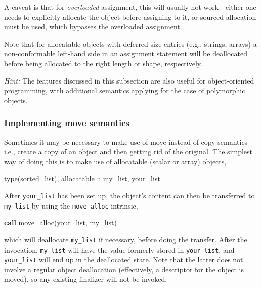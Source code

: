 \documentclass[
  paper=a4,
  ,captions=tableheading
]{scrartcl}
\newenvironment{Shaded}{\begin{snugshade}}{\end{snugshade}}
\newcommand{\DataTypeTok}[1]{\textcolor[rgb]{0.13,0.29,0.53}{#1}}
\newcommand{\KeywordTok}[1]{\textcolor[rgb]{0.13,0.29,0.53}{\textbf{#1}}}
\newcommand{\NormalTok}[1]{#1}
\begin{document}
A caveat is that for \emph{overloaded} assignment, this will usually not
work - either one needs to explicitly allocate the object before
assigning to it, or sourced allocation must be used, which bypasses the
overloaded assignment.

Note that for allocatable objects with deferred-size entries (e.g.,
strings, arrays) a non-conformable left-hand side in an assignment
statement will be deallocated before being allocated to the right length
or shape, respectively.

\emph{Hint:} The features discussed in this subsection are also useful
for object-oriented programming, with additional semantics applying for
the case of polymorphic objects.

\subsubsection{Implementing move
semantics}\label{implementing-move-semantics}

Sometimes it may be necessary to make use of move instead of copy
semantics i.e., create a copy of an object and then getting rid of the
original. The simplest way of doing this is to make use of allocatable
(scalar or array) objects,

\begin{Shaded}
\begin{Highlighting}[]
\DataTypeTok{type(sorted\_list)}\NormalTok{, }\DataTypeTok{allocatable} \DataTypeTok{::}\NormalTok{ my\_list, your\_list}
\end{Highlighting}
\end{Shaded}

After \texttt{your\_list} has been set up, the object's content can then
be transferred to \texttt{my\_list} by using the \texttt{move\_alloc}
intrinsic,

\begin{Shaded}
\begin{Highlighting}[]
\KeywordTok{call}\NormalTok{ move\_alloc(your\_list, my\_list)}
\end{Highlighting}
\end{Shaded}

which will deallocate \texttt{my\_list} if necessary, before doing the
transfer. After the invocation, \texttt{my\_list} will have the value
formerly stored in \texttt{your\_list}, and \texttt{your\_list} will end
up in the deallocated state. Note that the latter does not involve a
regular object deallocation (effectively, a descriptor for the object is
moved), so any existing finalizer will not be invoked.
\end{document}
